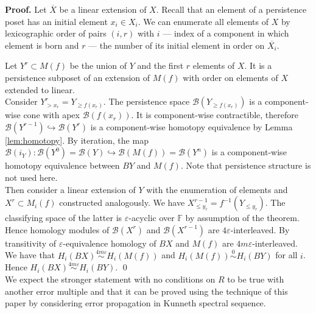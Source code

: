\documentclass[english,12pt]{article}
\numberwithin{equation}{section}
\theoremstyle{definition}
\theoremstyle{remark}
\newenvironment{pf}{\noindent\textbf{Proof.}}{\qed}
\renewcommand{\leq}{\leqslant}
\renewcommand{\geq}{\geqslant}
\begin{document}
\begin{pf}
  Let $\overline{X}$ be a linear extension of $X$. Recall that an element of a persistence poset has an initial element $x_i \in X_i$. We can enumerate all elements of $X$ by lexicographic order of pairs $(i,r)$ with $i$ --- index of a component in which element is born and $r$ --- the number of its initial element in order on $\overline{X_i}$.

  Let $Y^r \subset M(f)$ be the union of $Y$ and the first $r$ elements of $X$. It is a persistence subposet of an extension of $M(f)$ with order on elements of $X$ extended to linear.\\

  Consider $Y^r_{>x_r} = Y_{\geq f(x_r)}$. The persistence space $\mathcal{B}(Y_{\geq f(x_r)})$ is a component-wise cone with apex $\mathcal{B}(f(x_r))$. It is component-wise contractible, therefore $\mathcal{B}(Y^{r-1}) \hookrightarrow \mathcal{B}(Y^{r})$ is a component-wise homotopy equivalence by Lemma \ref{lem:homotopy}. By iteration, the map $\mathcal{B}(i_Y) : \mathcal{B}(Y^{0}) = \mathcal{B}(Y) \hookrightarrow \mathcal{B}(M(f)) = \mathcal{B}(Y^n)$ is a component-wise homotopy equivalence between $BY$ and $M(f)$. Note that persistence structure is not used here.\\

  Then consider a linear extension of $Y$ with the enumeration of elements and $X^r \subset M_i(f)$ constructed analogously. We have $X^{r-1}_{\leq y_r} = f^{-1}(Y_{\leqslant y_r})$. The classifying space of the latter is $\varepsilon$-acyclic over $\mathbb{F}$ by assumption of the theorem. Hence homology modules of $\mathcal{B}(X^{r})$ and $\mathcal{B}(X^{r-1})$ are $4\varepsilon$-interleaved. By transitivity of $\varepsilon$-equivalence homology of $BX$ and $M(f)$ are $4m\varepsilon$-interleaved.\\

  We have that $H_i(BX) \stackrel{4m\varepsilon}{\sim} H_i(M(f))$ and $H_i(M(f)) \stackrel{0}{\sim} H_i(BY)$ for all $i$. Hence $H_i(BX) \stackrel{4m\varepsilon}{\sim} H_i(BY)$.
\end{pf}\\

We expect the stronger statement with no conditions on $R$ to be true with another error multiple and that it can be proved using the technique of this paper by considering error propagation in Kunneth spectral sequence.
\end{document}

